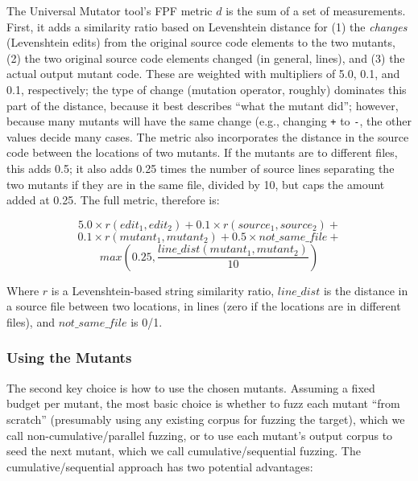 The Universal Mutator \cite{regexpMut} tool's FPF metric $d$ is
the sum of a set of measurements.  First, it adds a similarity
ratio based on Levenshtein distance \cite{lev} for (1) the \emph{changes} (Levenshtein edits) from
the original source code elements to
the two mutants,  (2) the two original source code elements changed (in
general, lines), and (3) the actual output mutant code.  These are
weighted with multipliers of 5.0, 0.1, and 0.1, respectively; the type
of change (mutation operator, roughly) dominates this part of the
distance, because it best describes ``what the mutant did''; however,
because many mutants will have the same change (e.g., changing {\tt +}
to {\tt -}, the other values decide many cases.
The metric also incorporates the distance in the source
code between the locations of two mutants.  If the mutants are to
different files, this adds 0.5; it also adds 0.25
times the number of source lines separating the two mutants if they
are in the same file, divided by 10, but caps the amount added at
0.25.  The full metric, therefore is:

$$ 5.0 \times r(\mathit{edit}_1, \mathit{edit}_2) + 0.1 \times r(\mathit{source}_1, \mathit{source}_2) +$$
$$0.1 \times r(\mathit{mutant}_1, \mathit{mutant}_2) + 0.5 \times \mathit{not\_same\_file} +$$
$$max(0.25, \frac{\mathit{line\_dist}(\mathit{mutant}_1, \mathit{mutant}_2)}{10})$$

\noindent Where $r$ is a Levenshtein-based string similarity ratio,
$\mathit{line\_dist}$ is the distance in a source file between
two locations, in lines (zero if the locations are in different
files), and $\mathit{not\_same\_file}$ is 0/1.

\subsubsection{Using the Mutants}

The second key choice is how to use the chosen mutants.  Assuming a fixed budget per mutant, the most
basic choice is whether to fuzz each mutant ``from scratch'' (presumably using any existing corpus for
fuzzing the target), which we call non-cumulative/parallel fuzzing,  or to use each mutant's output corpus to seed the next mutant, which we call cumulative/sequential fuzzing.  The cumulative/sequential
approach has two potential advantages:

